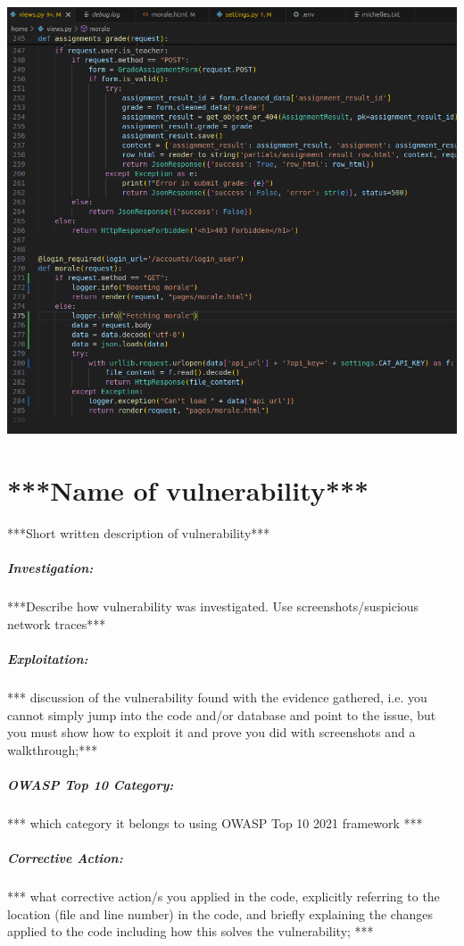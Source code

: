 \begin{center}
    \includegraphics[width = \linewidth]{images/Michelle/viewschange.png}
\end{center}

\section{***Name of vulnerability***}

***Short written description of vulnerability***

\subparagraph{Investigation:}

***Describe how vulnerability was investigated. Use screenshots/suspicious network traces***

\subparagraph{Exploitation:}

*** discussion of the vulnerability found with the evidence gathered, i.e. you cannot simply jump into the code and/or database and point to the issue, but you must show how to exploit it and prove you did with screenshots and a walkthrough;***

\subparagraph{OWASP Top 10 Category:}

*** which category it belongs to using OWASP Top 10 2021 framework ***

\subparagraph{Corrective Action:}

*** what corrective action/s you applied in the code, explicitly referring to the location (file and line number) in the code, and briefly explaining the changes applied to the code including how this solves the vulnerability; ***